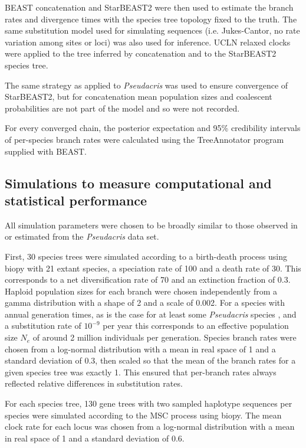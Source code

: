 \documentclass[12pt]{article}
\begin{document}
BEAST concatenation and StarBEAST2 were then used to estimate the branch rates
and divergence times with the species tree topology fixed to the truth. The same
substitution model used for simulating sequences (i.e. Jukes-Cantor, no rate
variation among sites or loci) was also used for inference. UCLN relaxed
clocks were applied to the tree inferred by concatenation and to the
StarBEAST2 species tree.

The same strategy as applied to \textit{Pseudacris} was used to ensure
convergence of StarBEAST2, but for concatenation mean population sizes and coalescent
probabilities are not part of the model and so were not recorded.

For every converged chain, the posterior expectation and 95\% credibility
intervals of per-species branch rates were calculated using the TreeAnnotator
program supplied with BEAST.

\subsection{Simulations to measure computational and statistical performance}

All simulation parameters were chosen to be broadly similar to those observed in
or estimated from the \textit{Pseudacris} data set.

First, 30 species trees were simulated according to a birth-death process
\citep{Gernhard2008769} using biopy with 21 extant species, a speciation rate
of 100 and a death rate of 30. This corresponds to a net diversification rate
of 70 and an extinction fraction of 0.3. Haploid population sizes for each
branch were chosen independently from a gamma distribution with a shape of 2
and a scale of 0.002. For a species with annual generation times, as is the
case for at least some \textit{Pseudacris} species \citep{10.2307/1446044},
and a substitution rate of $10^{-9}$ per year this corresponds to an effective
population size $N_e$ of around 2 million individuals per generation. Species
branch rates were chosen from a log-normal distribution with a mean in real
space of 1 and a standard deviation of 0.3, then scaled so that the mean of
the branch rates for a given species tree was exactly 1. This ensured that
per-branch rates always reflected relative differences in substitution rates.

For each species tree, 130 gene trees with two sampled haplotype sequences per
species were simulated according to the MSC process using biopy. The mean
clock rate for each locus was chosen from a log-normal distribution with a
mean in real space of 1 and a standard deviation of 0.6.
\end{document}
